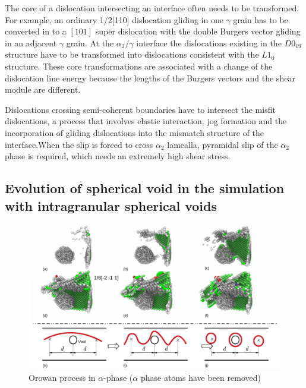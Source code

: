 \documentclass[materials,article,submit,moreauthors,pdftex,10pt,a4paper]{Definitions/mdpi}
\begin{document}
	
The core of a dislocation intersecting an interface often needs to be transformed. For example, an ordinary 1/2[110] dislocation gliding in one $\gamma$ grain has to be converted in to a $[101]$ super dislocation with the double Burgers vector gliding in an adjacent $\gamma$ grain. At the $\alpha_2/\gamma$ interface the dislocations existing in the $D0_{19}$ structure have to be transformed into dislocations consistent with the $L1_0$structure. These core transformations are associated with a change of the dislocation line energy because the lengths of the Burgers vectors and the shear module are different.
	
Dislocations crossing semi-coherent boundaries have to intersect the misfit dislocations, a process that involves elastic interaction, jog formation and the incorporation of gliding dislocations into the mismatch structure of the interface.When the slip is forced to cross $\alpha_2$ lamealla, pyramidal slip of the $\alpha_2$ phase is required, which needs an extremely high shear stress.

\subsection{Evolution of spherical void in the simulation with intragranular spherical voids}

\begin{figure}[ht]
	\centering
	\includegraphics[width=1\linewidth]{"img/dis-void2"}
	\caption{Orowan process in $\alpha$-phase ($\alpha$ phase atoms have been removed)}
	\label{fig:orowan}
\end{figure}
\end{document}
